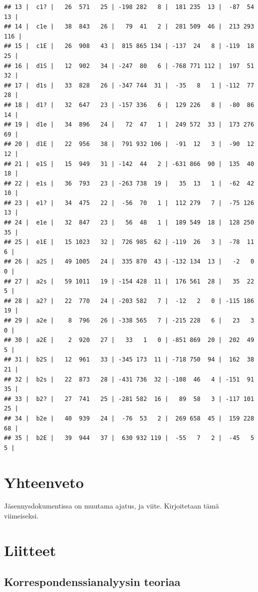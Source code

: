 \documentclass[
  finnish,
]{book}
\begin{document}
\begin{verbatim}
## 13 |  c1? |   26  571   25 | -198 282   8 |  181 235  13 |  -87  54  13 |
## 14 |  c1e |   38  843   26 |   79  41   2 |  281 509  46 |  213 293 116 |
## 15 |  c1E |   26  908   43 |  815 865 134 | -137  24   8 | -119  18  25 |
## 16 |  d1S |   12  902   34 | -247  80   6 | -768 771 112 |  197  51  32 |
## 17 |  d1s |   33  828   26 | -347 744  31 |  -35   8   1 | -112  77  28 |
## 18 |  d1? |   32  647   23 | -157 336   6 |  129 226   8 |  -80  86  14 |
## 19 |  d1e |   34  896   24 |   72  47   1 |  249 572  33 |  173 276  69 |
## 20 |  d1E |   22  956   38 |  791 932 106 |  -91  12   3 |  -90  12  12 |
## 21 |  e1S |   15  949   31 | -142  44   2 | -631 866  90 |  135  40  18 |
## 22 |  e1s |   36  793   23 | -263 738  19 |   35  13   1 |  -62  42  10 |
## 23 |  e1? |   34  475   22 |  -56  70   1 |  112 279   7 |  -75 126  13 |
## 24 |  e1e |   32  847   23 |   56  48   1 |  189 549  18 |  128 250  35 |
## 25 |  e1E |   15 1023   32 |  726 985  62 | -119  26   3 |  -78  11   6 |
## 26 |  a2S |   49 1005   24 |  335 870  43 | -132 134  13 |   -2   0   0 |
## 27 |  a2s |   59 1011   19 | -154 428  11 |  176 561  28 |   35  22   5 |
## 28 |  a2? |   22  770   24 | -203 582   7 |  -12   2   0 | -115 186  19 |
## 29 |  a2e |    8  796   26 | -338 565   7 | -215 228   6 |   23   3   0 |
## 30 |  a2E |    2  920   27 |   33   1   0 | -851 869  20 |  202  49   5 |
## 31 |  b2S |   12  961   33 | -345 173  11 | -718 750  94 |  162  38  21 |
## 32 |  b2s |   22  873   28 | -431 736  32 | -108  46   4 | -151  91  35 |
## 33 |  b2? |   27  741   25 | -281 582  16 |   89  58   3 | -117 101  25 |
## 34 |  b2e |   40  939   24 |  -76  53   2 |  269 658  45 |  159 228  68 |
## 35 |  b2E |   39  944   37 |  630 932 119 |  -55   7   2 |  -45   5   5 |
\end{verbatim}

\hypertarget{yhteenveto}{%
\chapter{Yhteenveto}\label{yhteenveto}}

Jäsennysdokumentissa on muutama ajatus, ja viite. Kirjoitetaan tämä
viimeiseksi.

\hypertarget{liitteet}{%
\chapter*{Liitteet}\label{liitteet}}

\hypertarget{korrespondenssianalyysin-teoriaa}{%
\section{Korrespondenssianalyysin
teoriaa}\label{korrespondenssianalyysin-teoriaa}}
\end{document}
